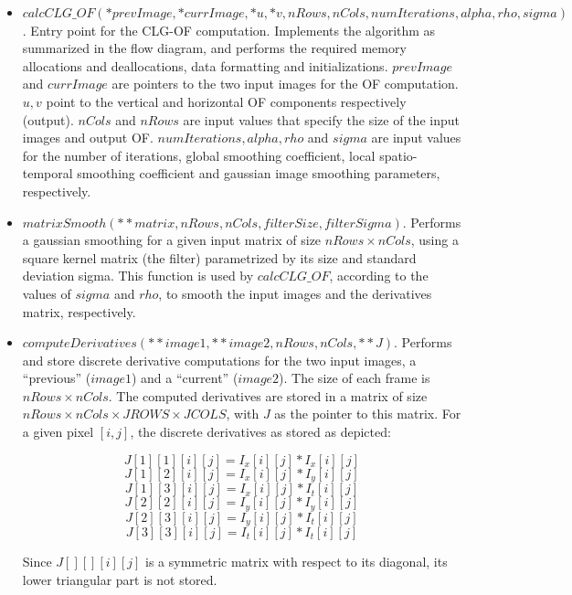 \documentclass{article}
\begin{document}
\begin{itemize}
 \item $calcCLG\_OF(*prevImage, *currImage, *u, *v, nRows, nCols, numIterations, 
       alpha, rho, sigma)$.
       Entry point for the CLG-OF computation. Implements the algorithm as 
       summarized in the flow diagram, and performs the required memory 
       allocations and deallocations, data formatting and initializations. 
       $prevImage$ and $currImage$ are pointers to the two input images for the 
       OF computation. $u,v$ point to the vertical and horizontal OF components 
       respectively (output). $nCols$ and $nRows$ are input values that specify 
       the size of the input images and output OF. $numIterations, alpha, rho$ 
       and $sigma$ are input values for the number of iterations, global 
       smoothing coefficient, local spatio-temporal smoothing coefficient and 
       gaussian image smoothing parameters, respectively.

 \item $matrixSmooth(**matrix, nRows, nCols, filterSize, filterSigma)$. 
       Performs a gaussian smoothing for a given input matrix of size 
       $nRows \times nCols$, using a square kernel matrix (the filter) 
       parametrized by its size and standard deviation sigma. This function is 
       used by $calcCLG\_OF$, according to the values of $sigma$ and $rho$, to 
       smooth the input images and the derivatives matrix, respectively.

 \item $computeDerivatives(**image1, **image2, nRows, nCols, **J)$. 
       Performs and store discrete derivative computations for the two input 
       images, a ``previous'' ($image1$) and a ``current'' ($image2$). The size 
       of each frame is $nRows \times nCols$. The computed derivatives are stored 
       in a matrix of size $nRows \times nCols \times JROWS \times JCOLS$, with 
       $J$ as the pointer to this matrix. For a given pixel $[i,j]$, the discrete 
       derivatives as stored as depicted:

       \[ J[1][1][i][j] = I_x[i][j] * I_x[i][j] \]
       \[ J[1][2][i][j] = I_x[i][j] * I_y[i][j] \]
       \[ J[1][3][i][j] = I_x[i][j] * I_t[i][j] \]
       \[ J[2][2][i][j] = I_y[i][j] * I_y[i][j] \]
       \[ J[2][3][i][j] = I_y[i][j] * I_t[i][j] \]
       \[ J[3][3][i][j] = I_t[i][j] * I_t[i][j] \]

       Since $J[][][i][j]$ is a symmetric matrix with respect to its diagonal, 
       its lower triangular part is not stored.


\end{itemize}
\end{document}
